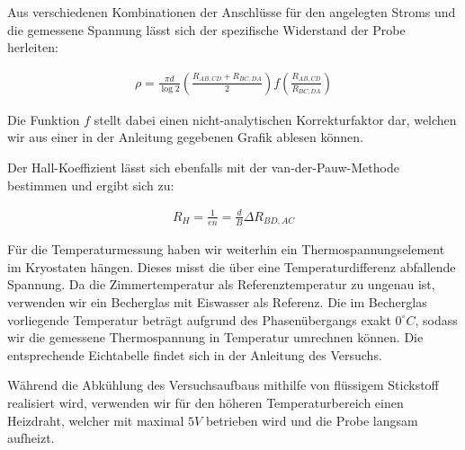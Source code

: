 Aus verschiedenen Kombinationen der Anschlüsse für den angelegten Stroms und die gemessene Spannung lässt sich der spezifische Widerstand der Probe herleiten:

\begin{align}
\rho = \frac{\pi d}{\log{2}}\left(\frac{R_{AB,CD}+R_{BC,DA}}{2}\right)f\left(\frac{R_{AB,CD}}{R_{BC,DA}}\right)
\end{align}

Die Funktion $f$ stellt dabei einen nicht-analytischen Korrekturfaktor dar, welchen wir aus einer in der Anleitung gegebenen Grafik ablesen können. 

Der Hall-Koeffizient lässt sich ebenfalls mit der van-der-Pauw-Methode bestimmen und ergibt sich zu:

\begin{align}
R_H=\frac{1}{en}=\frac{d}{B}\Delta R_{BD,AC}
\end{align}

Für die Temperaturmessung haben wir weiterhin ein Thermospannungselement im Kryostaten hängen. Dieses misst die über eine Temperaturdifferenz abfallende Spannung. Da die Zimmertemperatur als Referenztemperatur zu ungenau ist, verwenden wir ein Becherglas mit Eiswasser als Referenz. Die im Becherglas vorliegende Temperatur beträgt aufgrund des Phasenübergangs exakt $0^{\circ}C$, sodass wir die gemessene Thermospannung in Temperatur umrechnen können. Die entsprechende Eichtabelle findet sich in der Anleitung des Versuchs.

Während die Abkühlung des Versuchsaufbaus mithilfe von flüssigem Stickstoff realisiert wird, verwenden wir für den höheren Temperaturbereich einen Heizdraht, welcher mit maximal $5V$ betrieben wird und die Probe langsam aufheizt. 
